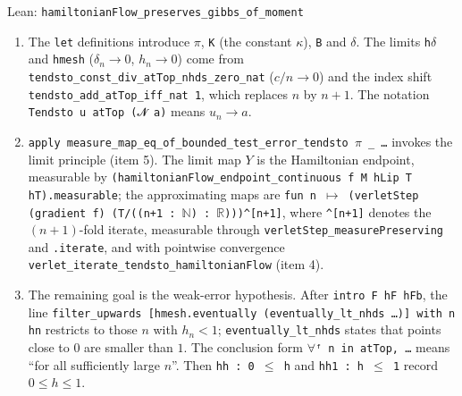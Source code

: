 \documentclass[11pt,a4paper]{article}
\begin{document}
\begin{leanbox}{Lean: \texttt{hamiltonianFlow\_\allowbreak{}preserves\_\allowbreak{}gibbs\_\allowbreak{}of\_\allowbreak{}moment}}
\begin{enumerate}
\item The \texttt{let} definitions introduce \texttt{\ensuremath{\pi}}, \texttt{K} (the constant \(\kappa\)), \texttt{B} and \texttt{\ensuremath{\delta}}. The limits \texttt{h\ensuremath{\delta}} and \texttt{hmesh} (\(\delta_n\to0\), \(h_n\to0\)) come from \texttt{tendsto\_\allowbreak{}const\_\allowbreak{}div\_\allowbreak{}at\allowbreak{}Top\_\allowbreak{}nhds\_\allowbreak{}zero\_\allowbreak{}nat} (\(c/n\to0\)) and the index shift \texttt{tendsto\_\allowbreak{}add\_\allowbreak{}at\allowbreak{}Top\_\allowbreak{}iff\_\allowbreak{}nat 1}, which replaces \(n\) by \(n+1\). The notation \texttt{Tendsto u at\allowbreak{}Top ({\leanfallback 𝓝} a)} means \(u_n\to a\).

\item \texttt{apply measure\_\allowbreak{}map\_\allowbreak{}eq\_\allowbreak{}of\_\allowbreak{}bounded\_\allowbreak{}test\_\allowbreak{}error\_\allowbreak{}tendsto \ensuremath{\pi} \_\allowbreak{} …} invokes the limit principle (item 5). The limit map \(Y\) is the Hamiltonian endpoint, measurable by \texttt{(hamiltonian\allowbreak{}Flow\_\allowbreak{}endpoint\_\allowbreak{}continuous f M h\allowbreak{}Lip T h\allowbreak{}T).\allowbreak{}measurable}; the approximating maps are \texttt{fun n \ensuremath{\mapsto} (verlet\allowbreak{}Step (gradient f) (T/\allowbreak{}((n+1 : \ensuremath{\mathbb N}) : \ensuremath{\mathbb R})))\textasciicircum{}[n+1]}, where \texttt{\textasciicircum{}[n+1]} denotes the \((n+1)\)-fold iterate, measurable through \texttt{verlet\allowbreak{}Step\_\allowbreak{}measure\allowbreak{}Preserving} and \texttt{.\allowbreak{}iterate}, and with pointwise convergence \texttt{verlet\_\allowbreak{}iterate\_\allowbreak{}tendsto\_\allowbreak{}hamiltonian\allowbreak{}Flow} (item 4).

\item The remaining goal is the weak-error hypothesis. After \texttt{intro F h\allowbreak{}F h\allowbreak{}Fb}, the line \texttt{filter\_\allowbreak{}upwards [hmesh.\allowbreak{}eventually (eventually\_\allowbreak{}lt\_\allowbreak{}nhds …)] with n hn} restricts to those \(n\) with \(h_n<1\); \texttt{eventually\_\allowbreak{}lt\_\allowbreak{}nhds} states that points close to \(0\) are smaller than \(1\). The conclusion form \texttt{\ensuremath{\forall}ᶠ n in at\allowbreak{}Top, …} means “for all sufficiently large \(n\)”. Then \texttt{hh : 0 \ensuremath{\le} h} and \texttt{hh1 : h \ensuremath{\le} 1} record \(0\le h\le1\).


\end{enumerate}
\end{leanbox}
\end{document}

